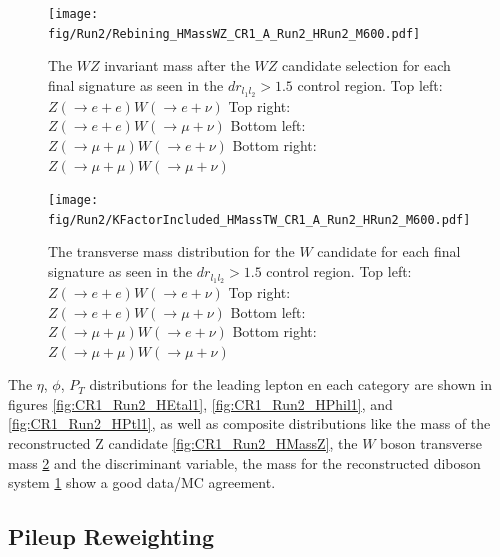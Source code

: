 \begin{figure}[tph]
  \centering
  \texttt{[image: fig/Run2/Rebining\_HMassWZ\_CR1\_A\_Run2\_HRun2\_M600.pdf]}
  \caption{The $WZ$ invariant mass after the $WZ$ candidate selection for each final
    signature as seen in the $dr_{l_{1}l_{2}} > 1.5$ control region.
    Top left: $Z(\rightarrow e+e)W(\rightarrow e+\nu)$
    Top right: $Z(\rightarrow e+e)W(\rightarrow \mu+\nu)$
    Bottom left: $Z(\rightarrow \mu+\mu)W(\rightarrow e+\nu)$
    Bottom right: $Z(\rightarrow \mu+\mu)W(\rightarrow \mu+\nu)$}
  \label{fig:CR1_Run2_HMassWZ}
\end{figure}

\begin{figure}[tph]
  \centering
  \texttt{[image: fig/Run2/KFactorIncluded\_HMassTW\_CR1\_A\_Run2\_HRun2\_M600.pdf]}
  \caption{The transverse mass distribution for the $W$ candidate for each final
    signature as seen in the $dr_{l_{1}l_{2}} > 1.5$ control region.
    Top left: $Z(\rightarrow e+e)W(\rightarrow e+\nu)$
    Top right: $Z(\rightarrow e+e)W(\rightarrow \mu+\nu)$
    Bottom left: $Z(\rightarrow \mu+\mu)W(\rightarrow e+\nu)$
    Bottom right: $Z(\rightarrow \mu+\mu)W(\rightarrow \mu+\nu)$}
  \label{fig:CR1_Run2_HMassTW}
\end{figure}

The $\eta$, $\phi$, $P_{T}$ distributions for the leading lepton en each category
are shown in figures \ref{fig:CR1_Run2_HEtal1}, \ref{fig:CR1_Run2_HPhil1}, and
\ref{fig:CR1_Run2_HPtl1}, as well as composite distributions like the mass of the
reconstructed Z candidate \ref{fig:CR1_Run2_HMassZ}, the $W$ boson transverse mass
\ref{fig:CR1_Run2_HMassTW} and the discriminant variable, the mass for the
reconstructed diboson system \ref{fig:CR1_Run2_HMassWZ} show a good data/MC
agreement.


\subsection{Pileup Reweighting}

